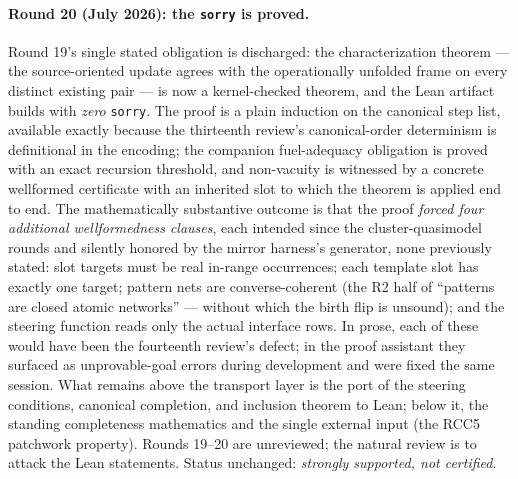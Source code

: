 \documentclass[
]{ceurart}
\theoremstyle{definition}
\begin{document}
\paragraph{Round 20 (July 2026): the \texttt{sorry} is proved.}
Round 19's single stated obligation is discharged: the
characterization theorem --- the source-oriented update agrees with
the operationally unfolded frame on every distinct existing pair ---
is now a kernel-checked theorem, and the Lean artifact builds with
\emph{zero} \texttt{sorry}.  The proof is a plain induction on the
canonical step list, available exactly because the thirteenth
review's canonical-order determinism is definitional in the encoding;
the companion fuel-adequacy obligation is proved with an exact
recursion threshold, and non-vacuity is witnessed by a concrete
wellformed certificate with an inherited slot to which the theorem is
applied end to end.  The mathematically substantive outcome is that
the proof \emph{forced four additional wellformedness clauses}, each
intended since the cluster-quasimodel rounds and silently honored by
the mirror harness's generator, none previously stated: slot targets
must be real in-range occurrences; each template slot has exactly one
target; pattern nets are converse-coherent (the R2 half of ``patterns
are closed atomic networks'' --- without which the birth flip is
unsound); and the steering function reads only the actual interface
rows.  In prose, each of these would have been the fourteenth
review's defect; in the proof assistant they surfaced as
unprovable-goal errors during development and were fixed the same
session.  What remains above the transport layer is the port of the
steering conditions, canonical completion, and inclusion theorem to
Lean; below it, the standing completeness mathematics and the single
external input (the RCC5 patchwork property).  Rounds 19--20 are
unreviewed; the natural review is to attack the Lean statements.
Status unchanged: \emph{strongly supported, not certified}.
\end{document}
